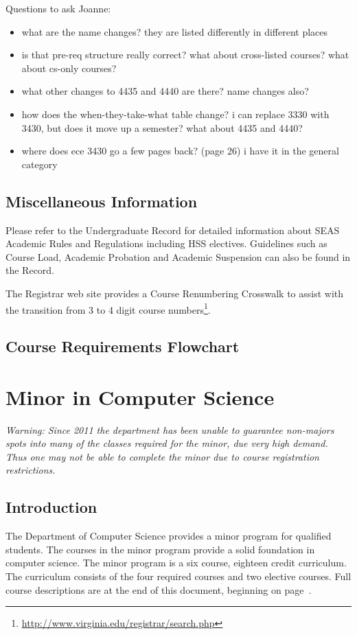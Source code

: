 \documentclass[10pt,letter]{book}
\newenvironment{itemlist}{
\begin{itemize}
\setlength{\itemsep}{0pt}
\setlength{\parskip}{0pt}}
{\end{itemize}}
\newcommand{\mychapter}[2]{\chapter{#1}\renewcommand{\leftmark}{\textsc{#2}}}
\newcommand{\mysection}[1]{\section{#1}\renewcommand{\rightmark}{#1}}
\newcommand{\myurl}[1]{\footnote{\scriptsize\url{#1}}}
\begin{document}
Questions to ask Joanne:
\begin{itemlist}
\item what are the name changes?  they are listed differently in
  different places
\item is that pre-req structure really correct? what about
  cross-listed courses?  what about cs-only courses?
\item what other changes to 4435 and 4440 are there?  name changes
  also?
\item how does the when-they-take-what table change?  i can replace
  3330 with 3430, but does it move up a semester?  what about 4435 and
  4440?
\item where does ece 3430 go a few pages back? (page 26) i have it in
  the general category
\end{itemlist}

\mysection{Miscellaneous Information}

Please refer to the Undergraduate Record for detailed information
about SEAS Academic Rules and Regulations including HSS
electives. Guidelines such as Course Load, Academic Probation and
Academic Suspension can also be found in the Record.

The Registrar web site provides a Course Renumbering Crosswalk to
assist with the transition from 3 to 4 digit course
numbers\myurl{http://www.virginia.edu/registrar/search.php}.



\clearpage
\mysection{Course Requirements Flowchart}

\begin{figure}[h!]
\end{figure}



\clearpage
\mychapter{Minor in Computer Science}{CS Minor}
\label{sec:csminor}

{\Large\em Warning: Since 2011 the department has been unable to
  guarantee non-majors spots into many of the classes required for the
  minor, due very high demand.  Thus one may not be able to complete
  the minor due to course registration restrictions.}

\mysection{Introduction}

The Department of Computer Science provides a minor program for
qualified students. The courses in the minor program provide a solid
foundation in computer science. The minor program is a six course,
eighteen credit curriculum. The curriculum consists of the four
required courses and two elective courses. Full course descriptions
are at the end of this document, beginning on
page~\pageref{sec:coursedesc}.
\end{document}
